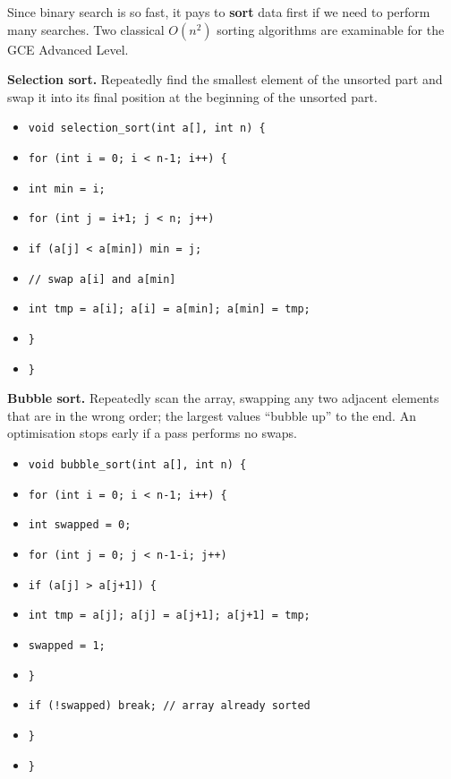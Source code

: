 \documentclass[11pt]{article}
\begin{document}
Since binary search is so fast, it pays to \textbf{sort} data first if we need to perform many searches. Two classical $O(n^2)$ sorting algorithms are examinable for the GCE Advanced Level.

\textbf{Selection sort.} Repeatedly find the smallest element of the unsorted part and swap it into its final position at the beginning of the unsorted part.

\begin{exemplebox}
\begin{itemize}
\item \texttt{void selection\_sort(int a[], int n) \{}
\item \texttt{\quad for (int i = 0; i < n-1; i++) \{}
\item \texttt{\quad\quad int min = i;}
\item \texttt{\quad\quad for (int j = i+1; j < n; j++)}
\item \texttt{\quad\quad\quad if (a[j] < a[min]) min = j;}
\item \texttt{\quad\quad // swap a[i] and a[min]}
\item \texttt{\quad\quad int tmp = a[i]; a[i] = a[min]; a[min] = tmp;}
\item \texttt{\quad \}}
\item \texttt{\}}
\end{itemize}
\end{exemplebox}

\textbf{Bubble sort.} Repeatedly scan the array, swapping any two adjacent elements that are in the wrong order; the largest values ``bubble up'' to the end. An optimisation stops early if a pass performs no swaps.

\begin{exemplebox}
\begin{itemize}
\item \texttt{void bubble\_sort(int a[], int n) \{}
\item \texttt{\quad for (int i = 0; i < n-1; i++) \{}
\item \texttt{\quad\quad int swapped = 0;}
\item \texttt{\quad\quad for (int j = 0; j < n-1-i; j++)}
\item \texttt{\quad\quad\quad if (a[j] > a[j+1]) \{}
\item \texttt{\quad\quad\quad\quad int tmp = a[j]; a[j] = a[j+1]; a[j+1] = tmp;}
\item \texttt{\quad\quad\quad\quad swapped = 1;}
\item \texttt{\quad\quad\quad \}}
\item \texttt{\quad\quad if (!swapped) break; // array already sorted}
\item \texttt{\quad \}}
\item \texttt{\}}
\end{itemize}
\end{exemplebox}
\end{document}
